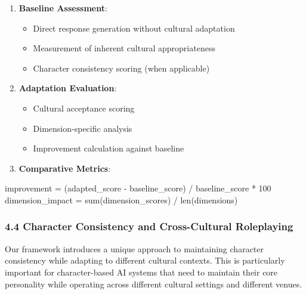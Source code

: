 \documentclass[
]{article}
\newenvironment{Shaded}{}{}
\newcommand{\BuiltInTok}[1]{\textcolor[rgb]{0.00,0.50,0.00}{#1}}
\newcommand{\DecValTok}[1]{\textcolor[rgb]{0.25,0.63,0.44}{#1}}
\newcommand{\NormalTok}[1]{#1}
\newcommand{\OperatorTok}[1]{\textcolor[rgb]{0.40,0.40,0.40}{#1}}
\providecommand{\tightlist}{%
  \setlength{\itemsep}{0pt}\setlength{\parskip}{0pt}}
\begin{document}
\begin{enumerate}
\def\labelenumi{\arabic{enumi}.}
\tightlist
\item
  \textbf{Baseline Assessment}:

  \begin{itemize}
  \tightlist
  \item
    Direct response generation without cultural adaptation
  \item
    Measurement of inherent cultural appropriateness
  \item
    Character consistency scoring (when applicable)
  \end{itemize}
\item
  \textbf{Adaptation Evaluation}:

  \begin{itemize}
  \tightlist
  \item
    Cultural acceptance scoring
  \item
    Dimension-specific analysis
  \item
    Improvement calculation against baseline
  \end{itemize}
\item
  \textbf{Comparative Metrics}:
\end{enumerate}

\begin{Shaded}
\begin{Highlighting}[]
\NormalTok{improvement }\OperatorTok{=}\NormalTok{ (adapted\_score }\OperatorTok{{-}}\NormalTok{ baseline\_score) }\OperatorTok{/}\NormalTok{ baseline\_score }\OperatorTok{*} \DecValTok{100}
\NormalTok{dimension\_impact }\OperatorTok{=} \BuiltInTok{sum}\NormalTok{(dimension\_scores) }\OperatorTok{/} \BuiltInTok{len}\NormalTok{(dimensions)}
\end{Highlighting}
\end{Shaded}

\subsubsection{4.4 Character Consistency and Cross-Cultural
Roleplaying}\label{character-consistency-and-cross-cultural-roleplaying}

Our framework introduces a unique approach to maintaining character
consistency while adapting to different cultural contexts. This is
particularly important for character-based AI systems that need to
maintain their core personality while operating across different
cultural settings and different venues.
\end{document}
